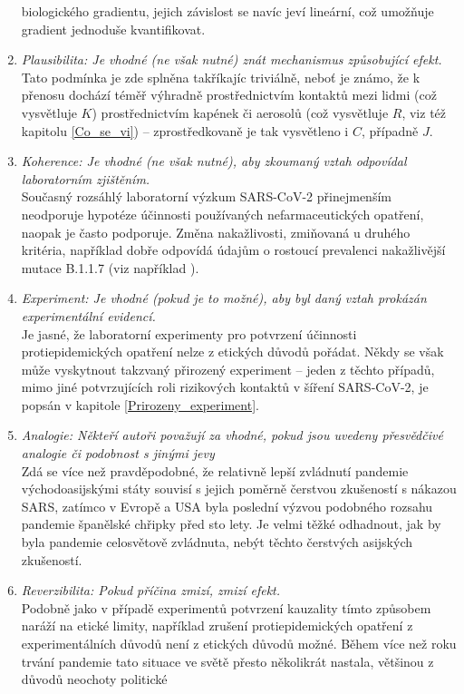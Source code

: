 \begin{enumerate}
biologického gradientu, jejich závislost se navíc jeví lineární, což umožňuje gradient jednoduše kvantifikovat.
\item \emph{Plausibilita: Je vhodné (ne však nutné) znát mechanismus způsobující
efekt.} \\
Tato podmínka je zde splněna takříkajíc triviálně, neboť je známo,
že k přenosu dochází téměř výhradně prostřednictvím kontaktů mezi lidmi
(což vysvětluje $K$) prostřednictvím kapének či aerosolů (což vysvětluje
$R$, viz též kapitolu \ref{Co_se_vi}) -- zprostředkovaně je tak vysvětleno i $C$, případně $J$.
\item \emph{Koherence: Je vhodné (ne však nutné), aby zkoumaný vztah odpovídal
laboratorním zjištěním.}\\
Současný rozsáhlý laboratorní výzkum SARS-CoV-2 přinejmenším neodporuje
hypotéze účinnosti používaných nefarmaceutických opatření, naopak
je často podporuje. Změna nakažlivosti, zmiňovaná u druhého kritéria, například dobře odpovídá údajům o rostoucí prevalenci nakažlivější mutace B.1.1.7 (viz například \cite{diana}).
\item \emph{Experiment: Je vhodné (pokud je to možné), aby byl daný vztah
prokázán experimentální evidencí.}\\
Je jasné, že laboratorní experimenty pro potvrzení účinnosti protiepidemických
opatření nelze z etických důvodů pořádat. Někdy se však může vyskytnout
takzvaný přirozený experiment -- jeden z těchto případů, mimo jiné potvrzujících
roli rizikových kontaktů v šíření SARS-CoV-2, je popsán v kapitole
\ref{Prirozeny_experiment}.
\item \emph{Analogie: Někteří autoři považují za vhodné, pokud jsou 
uvedeny přesvědčivé analogie či podobnost s jinými jevy}\\
Zdá se více než pravděpodobné, že relativně lepší zvládnutí pandemie
východoasijskými státy souvisí s jejich poměrně čerstvou zkušeností
s nákazou SARS, zatímco v Evropě a USA byla poslední 
výzvou podobného rozsahu pandemie španělské chřipky před sto lety. Je velmi těžké odhadnout,
jak by byla pandemie celosvětově zvládnuta, nebýt těchto čerstvých
asijských zkušeností.
\item \emph{Reverzibilita: Pokud příčina zmizí, zmizí efekt.}\\
Podobně jako v případě experimentů potvrzení kauzality tímto způsobem
naráží na etické limity, například zrušení protiepidemických opatření z experimentálních
důvodů není z etických důvodů možné. Během více než roku trvání pandemie tato situace
ve světě přesto několikrát nastala, většinou z důvodů neochoty politické

\end{enumerate}
